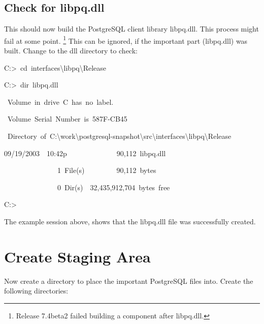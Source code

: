 \documentclass[english]{report}
\newenvironment{lyxcode}
   {\begin{list}{}{
     \setlength{\rightmargin}{\leftmargin}
     \setlength{\listparindent}{0pt}%
     \raggedright
     \setlength{\itemsep}{0pt}
     \setlength{\parsep}{0pt}
     \normalfont\ttfamily}%
    \item[]}
   {\end{list}}
\begin{document}
\subsection{Check for libpq.dll}

This should now build the PostgreSQL client library libpq.dll. This
process might fail at some point.%
\footnote{Release 7.4beta2 failed building a component after libpq.dll.%
} This can be ignored, if the important part (libpq.dll) was built.
Change to the dll directory to check:

\begin{lyxcode}
{\footnotesize C:>~cd~interfaces\textbackslash{}libpq\textbackslash{}Release}{\footnotesize \par}

{\footnotesize C:>~dir~libpq.dll}{\footnotesize \par}

~{\footnotesize Volume~in~drive~C~has~no~label.}{\footnotesize \par}

~{\footnotesize Volume~Serial~Number~is~587F-CB45}{\footnotesize \par}

~{\footnotesize Directory~of~C:\textbackslash{}work\textbackslash{}postgresql-snapshot\textbackslash{}src\textbackslash{}interfaces\textbackslash{}libpq\textbackslash{}Release}{\footnotesize \par}

{\footnotesize 09/19/2003~~10:42p~~~~~~~~~~~~~~90,112~libpq.dll}{\footnotesize \par}

~{\footnotesize ~~~~~~~~~~~~~~1~File(s)~~~~~~~~~90,112~bytes}{\footnotesize \par}

~{\footnotesize ~~~~~~~~~~~~~~0~Dir(s)~~32,435,912,704~bytes~free}{\footnotesize \par}

{\footnotesize C:>}{\footnotesize \par}
\end{lyxcode}
The example session above, shows that the libpq.dll file was successfully
created.


\section{Create Staging Area}

Now create a directory to place the important PostgreSQL files into.
Create the following directories:
\end{document}
